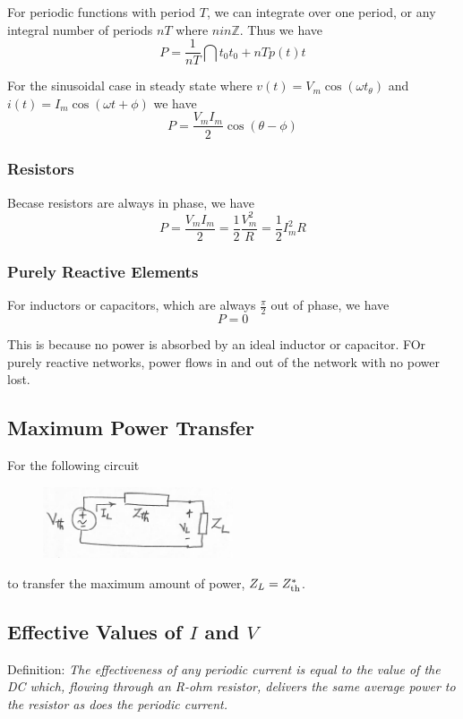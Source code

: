 \documentclass[12pt]{article}
\begin{document}
For periodic functions with period $T$, we can integrate over one period, or any integral number of periods $nT$ where $n in \mathbb{Z}$. Thus we have \[ P = \frac{1}{nT} \dint{t_0}{t_0+nT}{p(t)}{t} \]

For the sinusoidal case in steady state where $v(t) = V_m\cos(\omega t _ \theta)$ and $i(t) = I_m\cos(\omega t + \phi)$ we have \[ P = \frac{V_mI_m}{2}\cos(\theta - \phi) \]

\subsubsection*{Resistors}
Becase resistors are always in phase, we have \[ P = \frac{V_mI_m}{2} = \frac{1}{2}\frac{V_m^2}{R} = \frac{1}{2}I_m^2R \]

\subsubsection*{Purely Reactive Elements}
For inductors or capacitors, which are always $\frac{\pi}{2}$ out of phase, we have \[ P = 0 \]

This is because no power is absorbed by an ideal inductor or capacitor. FOr purely reactive networks, power flows in and out of the network with no power lost.

\newpage
\subsection*{Maximum Power Transfer}
For the following circuit
\begin{figure}[ht]
\centering
\includegraphics[width=0.5\textwidth]{impedance.png}
\end{figure}

to transfer the maximum amount of power, $Z_L = Z_{{\rm th}}^*$.

\subsection*{Effective Values of $I$ and $V$}
Definition: \textit{The effectiveness of any periodic current is equal to the value of the DC which, flowing through an R-ohm resistor, delivers the same average power to the resistor as does the periodic current.}
\end{document}
